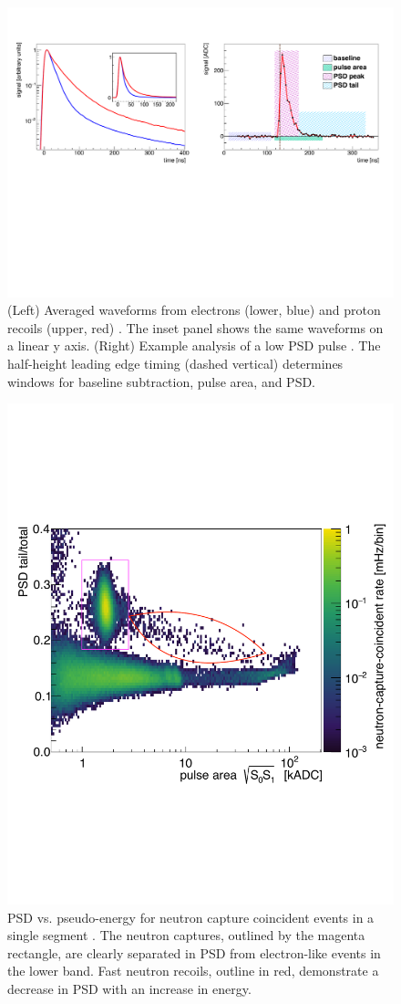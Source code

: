 \begin{figure}[t]
	\centering
	\includegraphics[width=0.99\linewidth]{tex/5-analysis-images/PSD_Define}
	\caption{(Left) Averaged waveforms from electrons (lower, blue) and proton recoils (upper, red) \cite{MM:2773}. The inset panel shows the same waveforms on a linear y axis. (Right) Example analysis of a low PSD pulse \cite{MM:2764}. The half-height leading edge timing (dashed vertical) determines windows for baseline subtraction, pulse area, and PSD. }
	\label{fig:psddefine}
\end{figure}

\begin{figure}[h]
	\centering
	\includegraphics[width=0.6\linewidth]{tex/5-analysis-images/PSD_vs_S_NRC}
	\caption{PSD vs. pseudo-energy for neutron capture coincident events in a single segment \cite{MM:2731}. The neutron captures, outlined by the magenta rectangle, are clearly separated in PSD from electron-like events in the lower band. Fast neutron recoils, outline in red, demonstrate a decrease in PSD with an increase in energy.}
	\label{fig:psdvss}
\end{figure}


